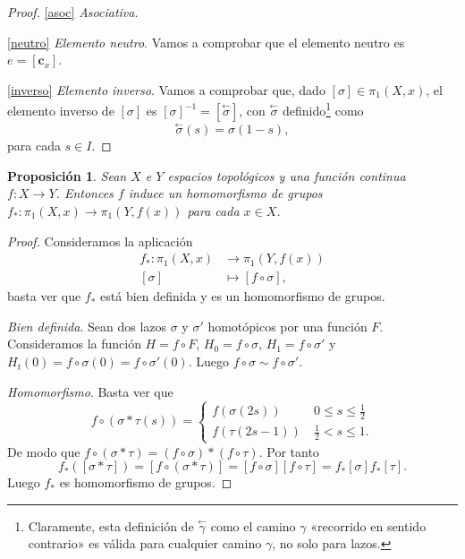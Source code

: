 \documentclass[12pt,a4paper]{book}
\newtheorem{prop}[thm]{Proposición}
\theoremstyle{definition} \newtheorem{defn}[thm]{Definición}
\theoremstyle{definition} \newtheorem{ejemplo}[thm]{Ejemplo}
\theoremstyle{definition} \newtheorem{ejercicio}[thm]{Ejercicio}
\theoremstyle{remark} \newtheorem*{obs}{Observación}
\def\cc{\mathbf{c}}
\def\gf{\pi_1}
\newcommand\cev[1]{\overset{\leftarrow}{#1}}
\begin{document}
\begin{proof}
  \ref{asoc} \textit{Asociativa}.
  
  \ref{neutro} \textit{Elemento neutro}. Vamos a comprobar que el elemento neutro es $e=[\cc_x]$.

  \ref{inverso} \textit{Elemento inverso}. Vamos a comprobar que, dado $[\sigma]\in \gf(X,x)$, el elemento inverso de $[\sigma]$ es $[\sigma]^{-1}=[\cev{\sigma}]$, con $\cev{\sigma}$ definido\footnote{ Claramente, esta definición de $\cev{\gamma}$ como el camino $\gamma$ «recorrido en sentido contrario» es válida para cualquier camino $\gamma$, no solo para lazos.} como
  \begin{equation*}
    \cev{\sigma}(s)=\sigma(1-s),
  \end{equation*}
  para cada $s \in I$.
\end{proof}
\begin{prop}\label{fstar}
  Sean $X$ e $Y$ espacios topológicos y una función continua $f:X\rightarrow Y$. Entonces $f$ induce un homomorfismo de grupos $f_*:\gf(X,x)\rightarrow \gf(Y,f(x))$ para cada $x \in X$.
\end{prop}
\begin{proof}
  Consideramos la aplicación
  \begin{align*}
    f_* :\gf(X,x)&\longrightarrow \gf(Y,f(x))\\ 
    [\sigma] &\longmapsto [f\circ \sigma],
    \end{align*}
    basta ver que $f_*$ está bien definida y es un homomorfismo de grupos.

    \textit{Bien definida}. Sean dos lazos $\sigma$ y $\sigma'$ homotópicos por una función $F$. Consideramos la función $H=f\circ F$, $H_0=f\circ \sigma$, $H_1=f \circ \sigma'$ y $H_t(0)=f\circ\sigma(0)=f\circ\sigma'(0)$. Luego $f\circ \sigma \sim f \circ \sigma'$.

    \textit{Homomorfismo}. Basta ver que 
    \begin{equation*}
      f\circ(\sigma*\tau (s))=
      \begin{cases}
	f(\sigma(2s)) & \ 0\leq s \leq \tfrac{1}{2} \\
	f(\tau(2s-1)) & \ \tfrac{1}{2} < s \leq 1.
      \end{cases}
    \end{equation*}
    De modo que $f\circ(\sigma*\tau)=(f\circ \sigma)*(f\circ \tau)$. Por tanto
    \begin{equation*}
      f_*([\sigma * \tau])=[f\circ(\sigma*\tau)]=[f\circ \sigma][f\circ \tau]=f_*[\sigma]f_*[\tau].
    \end{equation*}
    Luego $f_*$ es homomorfismo de grupos.
\end{proof}
\end{document}
